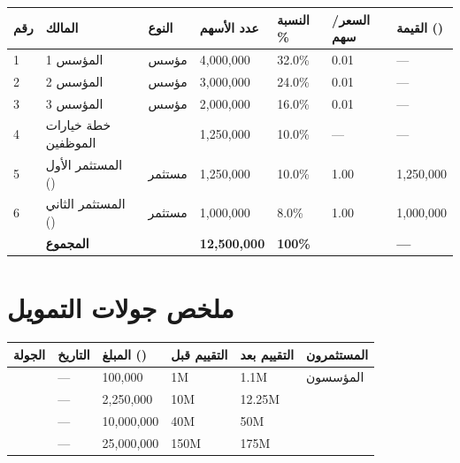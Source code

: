 \documentclass[11pt,a4paper,landscape]{article}
\begin{document}
\begin{table}[H]
\centering
\small
\renewcommand{\arraystretch}{1.5}
\begin{tabularx}{\textwidth}{C{1cm} L{5cm} C{2.5cm} C{2.5cm} C{2.5cm} C{2.5cm} C{2.5cm}}
\toprule
\textbf{رقم} & \textbf{المالك} & \textbf{النوع} & \textbf{عدد الأسهم} & \textbf{النسبة \%} & \textbf{السعر/سهم} & \textbf{القيمة ()} \\
\midrule
{}
1 & المؤسس 1 & مؤسس & 4,000,000 & 32.0\% & 0.01 & --- \\
2 & المؤسس 2 & مؤسس & 3,000,000 & 24.0\% & 0.01 & --- \\
3 & المؤسس 3 & مؤسس & 2,000,000 & 16.0\% & 0.01 & --- \\
4 & خطة خيارات الموظفين &  & 1,250,000 & 10.0\% & --- & --- \\
5 & المستثمر الأول () & مستثمر & 1,250,000 & 10.0\% & 1.00 & 1,250,000 \\
6 & المستثمر الثاني () & مستثمر & 1,000,000 & 8.0\% & 1.00 & 1,000,000 \\
\midrule
& \textbf{المجموع} & & \textbf{12,500,000} & \textbf{100\%} & & \textbf{---} \\
\bottomrule
\end{tabularx}
\end{table}

\section{ملخص جولات التمويل}
\label{sec:rounds}

\begin{table}[H]
\centering
\renewcommand{\arraystretch}{1.5}
\begin{tabularx}{\textwidth}{L{3cm} C{3cm} C{3cm} C{3cm} C{3cm} X}
\toprule
\textbf{الجولة} & \textbf{التاريخ} & \textbf{المبلغ ()} & \textbf{التقييم قبل} & \textbf{التقييم بعد} & \textbf{المستثمرون} \\
\midrule
{} & --- & 100,000 & 1M & 1.1M & المؤسسون \\
 & --- & 2,250,000 & 10M & 12.25M &  \\
 & --- & 10,000,000 & 40M & 50M &  \\
 & --- & 25,000,000 & 150M & 175M &  \\
\bottomrule
\end{tabularx}
\end{table}
\end{document}
